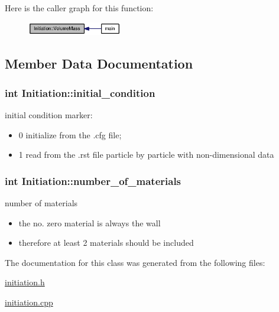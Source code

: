 Here is the caller graph for this function:\nopagebreak
\begin{figure}[H]
\begin{center}
\leavevmode
\includegraphics[width=117pt]{classInitiation_e80adc7d2105ad67b766fd1127966df3_icgraph}
\end{center}
\end{figure}


\subsection{Member Data Documentation}
\hypertarget{classInitiation_1bbced7f2136569c065e0f5c874c6cff}{
\subsubsection[{initial\_\-condition}]{\setlength{\rightskip}{0pt plus 5cm}int {\bf Initiation::initial\_\-condition}}}
\label{classInitiation_1bbced7f2136569c065e0f5c874c6cff}


initial condition marker: 

\begin{itemize}
\item 0 initialize from the .cfg file;\item 1 read from the .rst file particle by particle with non-dimensional data \end{itemize}
\hypertarget{classInitiation_ac12d75613f51d4a10a3f28887be0821}{
\subsubsection[{number\_\-of\_\-materials}]{\setlength{\rightskip}{0pt plus 5cm}int {\bf Initiation::number\_\-of\_\-materials}}}
\label{classInitiation_ac12d75613f51d4a10a3f28887be0821}


number of materials 

\begin{itemize}
\item the no. zero material is always the wall\item therefore at least 2 materials should be included \end{itemize}


The documentation for this class was generated from the following files:\begin{CompactItemize}
\item 
\hyperlink{initiation_8h}{initiation.h}\item 
\hyperlink{initiation_8cpp}{initiation.cpp}\end{CompactItemize}
